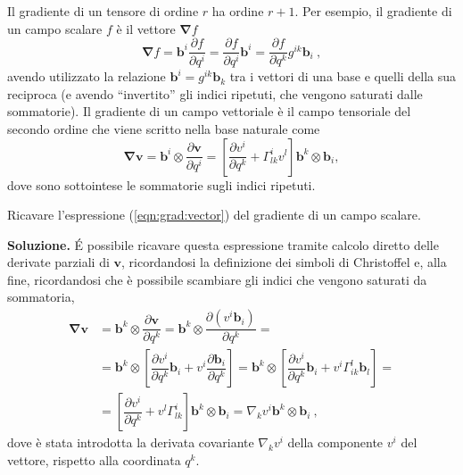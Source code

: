 %
 \noindent
 Il gradiente di un tensore di ordine $r$ ha ordine $r+1$. Per esempio, il gradiente di un campo scalare $f$ è il vettore $\bm{\nabla} f$
 \begin{equation}\label{eqn:grad:scalar}
  \bm{\nabla} f = \bm{b}^i \dfrac{\partial f}{\partial q^i} = \dfrac{\partial f}{\partial q^i} \bm{b}^i = \dfrac{\partial f}{\partial q^k} g^{ik} \bm{b}_i \ ,
 \end{equation}
 avendo utilizzato la relazione $\bm{b}^i = g^{ik} \bm{b}_k$ tra i vettori di una base e quelli della sua reciproca (e avendo ``invertito'' gli indici ripetuti, che vengono saturati dalle sommatorie).
 Il gradiente di un campo vettoriale è il campo tensoriale del secondo ordine che viene scritto nella base naturale come
 \begin{equation}\label{eqn:grad:vector}
   \bm{\nabla} \bm{v} = \bm{b}^i \otimes \dfrac{\partial \bm{v}}{\partial q^i} = \left[ \dfrac{\partial v^i}{\partial q^k} + \Gamma_{lk}^i v^l \right] \bm{b}^k \otimes \bm{b}_i ,
 \end{equation}
dove sono sottointese le sommatorie sugli indici ripetuti.
\begin{exercise} Ricavare l'espressione (\ref{eqn:grad:vector}) del gradiente di un campo scalare.

 \vspace{5pt}\noindent
 \textbf{Soluzione.} \'E possibile ricavare questa espressione tramite calcolo diretto delle derivate parziali di $\bm{v}$, ricordandosi la definizione dei simboli di Christoffel e, alla fine, ricordandosi che è possibile scambiare gli indici che vengono saturati da sommatoria, \vspace{-5pt}
\begin{equation}
\begin{aligned}
    \bm{\nabla} \bm{v} & = \bm{b}^k \otimes \dfrac{\partial \bm{v}}{\partial q^k} %
       = \bm{b}^k \otimes \dfrac{\partial (v^i \bm{b}_i)}{\partial q^k}  = \\
     & = \bm{b}^k \otimes \left[ \dfrac{\partial v^i }{\partial q^k} \bm{b}_i +
       v^i \dfrac{\partial \bm{b}_i}{\partial q^k} \right] %
       = \bm{b}^k \otimes \left[ \dfrac{\partial v^i }{\partial q^k} \bm{b}_i +
       v^i \Gamma^{l}_{ik} \bm{b}_l \right] = \\
     & = \left[ \dfrac{\partial v^i }{\partial q^k} +
       v^l \Gamma^{i}_{lk} \right] \bm{b}^k \otimes \bm{b}_i = \nabla_k v^i \bm{b}^k \otimes \bm{b}_i \ ,
\end{aligned}
\end{equation}
dove è stata introdotta la derivata covariante $\nabla_k v^i$ della componente $v^i$ del vettore, rispetto alla coordinata $q^k$.
\end{exercise}

